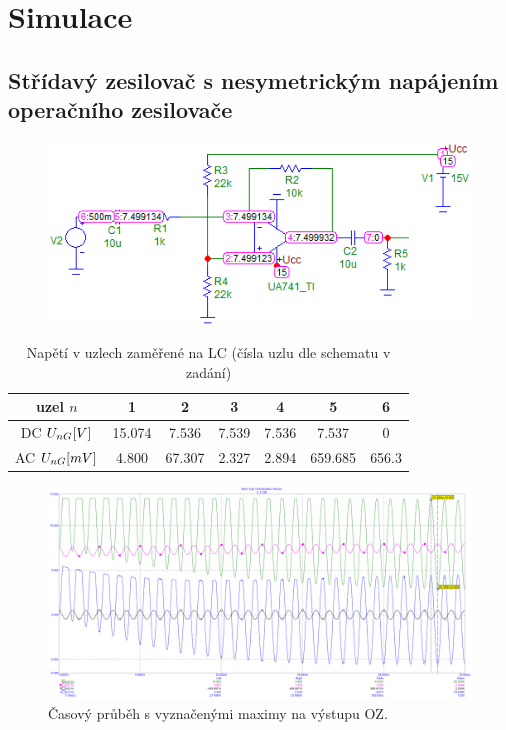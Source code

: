 \documentclass{article}
\begin{document}
\section*{Simulace}
\subsection*{Střídavý zesilovač s nesymetrickým napájením operačního zesilovače}
\begin{figure}[H]
  \begin{minipage}[t]{\textwidth}
    \includegraphics[width=\textwidth]{PC/ukol1/DC.png}
  \end{minipage}
\end{figure}

\begin{table}[H]
  \centering
  \begin{tabular}{|c|c|c|c|c|c|c|} 
    \hline
    uzel \(n\)          & 1       & 2      & 3     & 4     & 5       & 6      \\ \hline
    DC \(U_{nG}\-[V]\)  & 15.074  & 7.536  & 7.539 & 7.536 & 7.537   & 0      \\ \hline
    AC \(U_{nG}\-[mV]\) & 4.800   & 67.307 & 2.327 & 2.894 & 659.685 & 656.3  \\ \hline
  \end{tabular}
  \normalsize
  \caption{\label{tab_pracovni_bod_rozladeni1} Napětí v uzlech zaměřené na LC (čísla uzlu dle schematu v zadání)}
\end{table}

\begin{figure}[H]
  \vspace{-5mm}
  \begin{minipage}[t]{\textwidth}
    \centering
    \includegraphics[width=\textwidth]{PC/ukol1/transient.png}
    Časový průběh s vyznačenými maximy na výstupu OZ.
  \end{minipage}
\end{figure}
\end{document}
